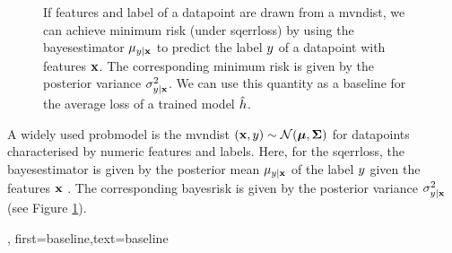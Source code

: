 {{\begin{figure}[h]
\begin{center}
		\end{center}
		\caption{If \gls{feature}s and \gls{label} of a \gls{datapoint} are drawn from a \gls{mvndist}, we 
		can achieve minimum \gls{risk} (under \gls{sqerrloss}) by using the \gls{bayesestimator} $\mu_{y|{\bf x}}$ 
		to predict the \gls{label} $y$ of a \gls{datapoint} with \gls{feature}s ${\bf x}$. The corresponding 
		minimum \gls{risk} is given by the posterior \gls{variance} $\sigma^{2}_{y|{\bf x}}$. We can use 
		this quantity as a baseline for the average \gls{loss} of a trained \gls{model} $\hat{h}$. \label{fig_post_baseline_dict}}
	\end{figure}
A widely used \gls{probmodel} is the \gls{mvndist} $\left( {\bf x},y \right) \sim \mathcal{N}({\bm \mu},{\bm \Sigma})$ 
for \gls{datapoint}s characterised by numeric \gls{feature}s and \gls{label}s.
Here, for the \gls{sqerrloss}, the \gls{bayesestimator} is given by the posterior 
mean $\mu_{y|{\bf x}}$ of the \gls{label} $y$ given the 
\gls{feature}s ${\bf x}$ \cite{LC,GrayProbBook}. The corresponding \gls{bayesrisk} 
is given by the posterior \gls{variance} 
$\sigma^{2}_{y|{\bf x}}$ (see Figure \ref{fig_post_baseline_dict}).},
    first={baseline},text={baseline}
}

